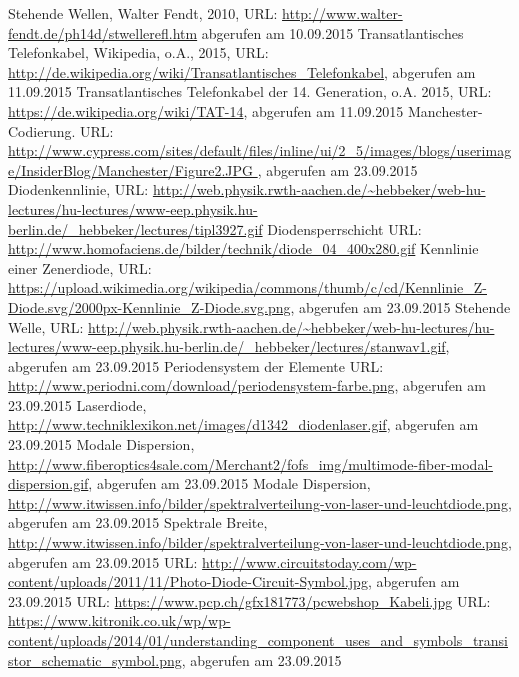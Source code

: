 \begin{thebibliography}{9999}
Stehende Wellen, Walter Fendt, 2010, URL: \url{http://www.walter-fendt.de/ph14d/stwellerefl.htm} abgerufen am 10.09.2015
Transatlantisches Telefonkabel, Wikipedia, o.A., 2015, URL: \url{http://de.wikipedia.org/wiki/Transatlantisches_Telefonkabel}, abgerufen am 11.09.2015
Transatlantisches Telefonkabel der 14. Generation, o.A. 2015, URL: \url{https://de.wikipedia.org/wiki/TAT-14}, abgerufen am 11.09.2015
Manchester-Codierung. URL: \url{http://www.cypress.com/sites/default/files/inline/ui/2_5/images/blogs/userimage/InsiderBlog/Manchester/Figure2.JPG
}, abgerufen am 23.09.2015
Diodenkennlinie, URL: \url{http://web.physik.rwth-aachen.de/~hebbeker/web-hu-lectures/hu-lectures/www-eep.physik.hu-berlin.de/_hebbeker/lectures/tipl3927.gif}
Diodensperrschicht URL: \url{http://www.homofaciens.de/bilder/technik/diode_04_400x280.gif}
Kennlinie einer Zenerdiode, URL: \url{https://upload.wikimedia.org/wikipedia/commons/thumb/c/cd/Kennlinie_Z-Diode.svg/2000px-Kennlinie_Z-Diode.svg.png}, abgerufen am 23.09.2015
Stehende Welle, URL: \url{http://web.physik.rwth-aachen.de/~hebbeker/web-hu-lectures/hu-lectures/www-eep.physik.hu-berlin.de/_hebbeker/lectures/stanwav1.gif}, abgerufen am 23.09.2015
Periodensystem der Elemente URL: \url{http://www.periodni.com/download/periodensystem-farbe.png}, abgerufen am 23.09.2015
Laserdiode, \url{http://www.techniklexikon.net/images/d1342_diodenlaser.gif}, abgerufen am 23.09.2015
Modale Dispersion, \url{http://www.fiberoptics4sale.com/Merchant2/fofs_img/multimode-fiber-modal-dispersion.gif}, abgerufen am 23.09.2015
Modale Dispersion, \url{http://www.itwissen.info/bilder/spektralverteilung-von-laser-und-leuchtdiode.png}, abgerufen am 23.09.2015
Spektrale Breite, \url{http://www.itwissen.info/bilder/spektralverteilung-von-laser-und-leuchtdiode.png}, abgerufen am 23.09.2015
URL: \url{http://www.circuitstoday.com/wp-content/uploads/2011/11/Photo-Diode-Circuit-Symbol.jpg}, abgerufen am 23.09.2015
URL: \url{https://www.pcp.ch/gfx181773/pcwebshop_Kabeli.jpg}
URL: \url{https://www.kitronik.co.uk/wp/wp-content/uploads/2014/01/understanding_component_uses_and_symbols_transistor_schematic_symbol.png}, abgerufen am 23.09.2015


\end{thebibliography}

